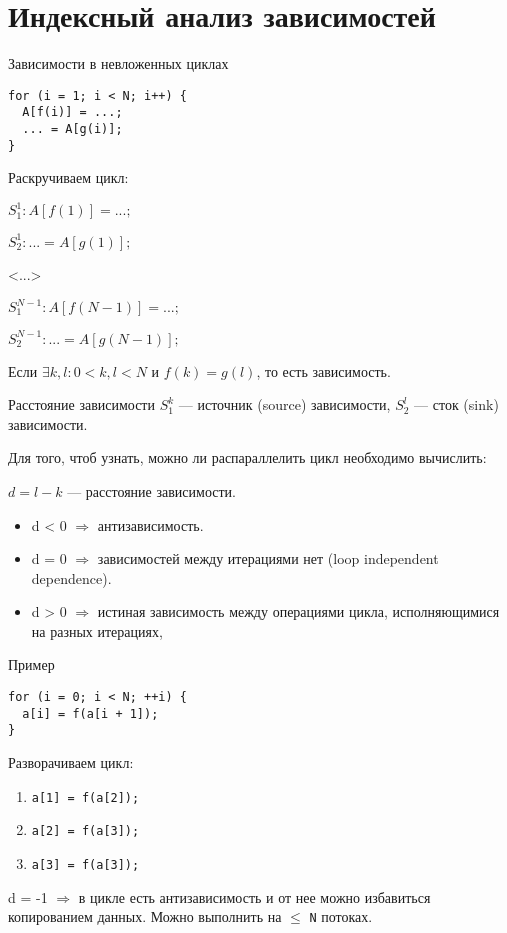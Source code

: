 \section{Индексный анализ зависимостей}

\begin{frame}[fragile]{Зависимости в невложенных циклах}
\begin{lstlisting}
for (i = 1; i < N; i++) {
  A[f(i)] = ...;
  ... = A[g(i)];
}
\end{lstlisting}

\pause

Раскручиваем цикл:

\bigskip

$S_1^1: A[f(1)] = ...;$

$S_2^1: ... = A[g(1)];$

<...>

$S_1^{N - 1}: A[f(N - 1)] = ...;$

$S_2^{N - 1}: ... = A[g(N - 1)];$

\pause\bigskip

Если $\exists k, l: 0 < k, l < N$ и $f(k) = g(l)$, то есть зависимость.
\end{frame}

\begin{frame}{Расстояние зависимости}
$S_1^k$ --- источник (\abbr source) зависимости, $S_2^l$ --- сток (\abbr sink)
зависимости.

\pause

Для того, чтоб узнать, можно ли распараллелить цикл необходимо вычислить:

$d = l - k$ --- расстояние зависимости.

\pause

\begin{itemize}
    \item d < 0 $\Rightarrow$ антизависимость.
    \item d = 0 $\Rightarrow$ зависимостей между итерациями нет (\abbr loop
    independent dependence).
    \item d > 0 $\Rightarrow$ истиная зависимость между операциями цикла,
    исполняющимися на разных итерациях,
\end{itemize}
\end{frame}

\begin{frame}[fragile]{Пример}
\begin{lstlisting}
for (i = 0; i < N; ++i) {
  a[i] = f(a[i + 1]);
}
\end{lstlisting}

Разворачиваем цикл:

\begin{enumerate}
  \item \texttt{a[1] = f(a[2]);}
  \item \texttt{a[2] = f(a[3]);}
  \item \texttt{a[3] = f(a[3]);}
\end{enumerate}

d = -1 $\Rightarrow$ в цикле есть антизависимость и от нее можно избавиться
копированием данных. Можно выполнить на $\leq$ \texttt{N} потоках.
\end{frame}

